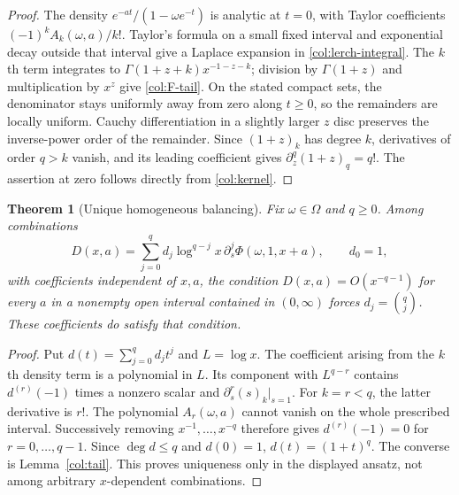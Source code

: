\documentclass[11pt,a4paper]{article}
\numberwithin{equation}{section}
\newtheorem{theorem}{Theorem}[section]
\theoremstyle{definition}
\theoremstyle{remark}
\begin{document}
\begin{proof}
The density $e^{-at}/(1-\omega e^{-t})$ is analytic at $t=0$,
with Taylor coefficients $(-1)^k A_k(\omega,a)/k!$.
Taylor's formula on a small fixed interval and exponential decay
outside that interval give a Laplace expansion in
\eqref{col:lerch-integral}. The $k$th term integrates to
$\Gamma(1+z+k)x^{-1-z-k}$; division by $\Gamma(1+z)$
and multiplication by $x^z$ give \eqref{col:F-tail}.
On the stated compact sets, the denominator stays uniformly away
from zero along $t\ge0$, so the remainders are locally uniform.
Cauchy differentiation in a slightly larger $z$ disc preserves
the inverse-power order of the remainder. Since $(1+z)_k$ has
degree $k$, derivatives of order $q>k$ vanish, and its leading
coefficient gives $\partial_z^q(1+z)_q=q!$.
The assertion at zero follows directly from \eqref{col:kernel}.
\end{proof}

\begin{theorem}[Unique homogeneous balancing]\label{col:unique}
Fix $\omega\in\Omega$ and $q\ge0$. Among combinations
\[
 D(x,a)=\sum_{j=0}^q d_j\log^{q-j}x\,
                  \partial_s^j\Phi(\omega,1,x+a),\qquad d_0=1,
\]
with coefficients independent of $x,a$, the condition
$D(x,a)=O(x^{-q-1})$ for every $a$ in a nonempty open interval contained in $(0,\infty)$
forces $d_j=\binom qj$. These coefficients do satisfy that condition.
\end{theorem}

\begin{proof}
Put $d(t)=\sum_{j=0}^q d_jt^j$ and $L=\log x$.
The coefficient arising from the $k$th density term is a polynomial
in $L$. Its component with $L^{q-r}$ contains
$d^{(r)}(-1)$ times a nonzero scalar and
$\partial_s^r(s)_k|_{s=1}$. For $k=r<q$, the latter derivative
is $r!$. The polynomial $A_r(\omega,a)$ cannot vanish on the
whole prescribed interval. Successively removing $x^{-1},\ldots,x^{-q}$
therefore gives $d^{(r)}(-1)=0$ for $r=0,\ldots,q-1$.
Since $\deg d\le q$ and $d(0)=1$, $d(t)=(1+t)^q$.
The converse is Lemma~\ref{col:tail}. This proves uniqueness only
in the displayed ansatz, not among arbitrary $x$-dependent combinations.
\end{proof}
\end{document}
